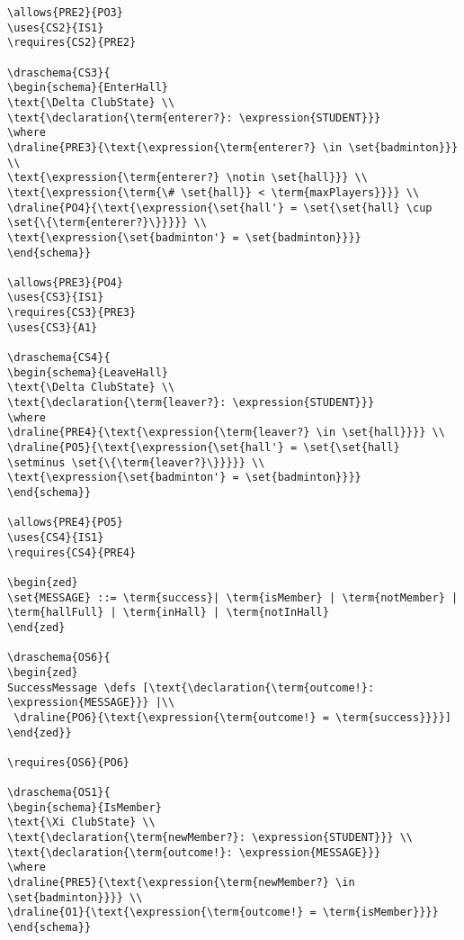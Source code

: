 \begin{verbatim}
\allows{PRE2}{PO3}
\uses{CS2}{IS1}
\requires{CS2}{PRE2}

\draschema{CS3}{
\begin{schema}{EnterHall}
\text{\Delta ClubState} \\
\text{\declaration{\term{enterer?}: \expression{STUDENT}}}
\where
\draline{PRE3}{\text{\expression{\term{enterer?} \in \set{badminton}}} \\
\text{\expression{\term{enterer?} \notin \set{hall}}} \\
\text{\expression{\term{\# \set{hall}} < \term{maxPlayers}}}} \\
\draline{PO4}{\text{\expression{\set{hall'} = \set{\set{hall} \cup \set{\{\term{enterer?}\}}}}} \\
\text{\expression{\set{badminton'} = \set{badminton}}}}
\end{schema}}

\allows{PRE3}{PO4}
\uses{CS3}{IS1}
\requires{CS3}{PRE3}
\uses{CS3}{A1}

\draschema{CS4}{
\begin{schema}{LeaveHall}
\text{\Delta ClubState} \\
\text{\declaration{\term{leaver?}: \expression{STUDENT}}}
\where
\draline{PRE4}{\text{\expression{\term{leaver?} \in \set{hall}}}} \\
\draline{PO5}{\text{\expression{\set{hall'} = \set{\set{hall} \setminus \set{\{\term{leaver?}\}}}}} \\
\text{\expression{\set{badminton'} = \set{badminton}}}}
\end{schema}}

\allows{PRE4}{PO5}
\uses{CS4}{IS1}
\requires{CS4}{PRE4}

\begin{zed}
\set{MESSAGE} ::= \term{success}| \term{isMember} | \term{notMember} | \term{hallFull} | \term{inHall} | \term{notInHall}
\end{zed}

\draschema{OS6}{
\begin{zed}
SuccessMessage \defs [\text{\declaration{\term{outcome!}: \expression{MESSAGE}}} |\\
 \draline{PO6}{\text{\expression{\term{outcome!} = \term{success}}}}]
\end{zed}}

\requires{OS6}{PO6}

\draschema{OS1}{
\begin{schema}{IsMember}
\text{\Xi ClubState} \\
\text{\declaration{\term{newMember?}: \expression{STUDENT}}} \\
\text{\declaration{\term{outcome!}: \expression{MESSAGE}}}
\where
\draline{PRE5}{\text{\expression{\term{newMember?} \in \set{badminton}}}} \\
\draline{O1}{\text{\expression{\term{outcome!} = \term{isMember}}}}
\end{schema}}


\end{verbatim}
